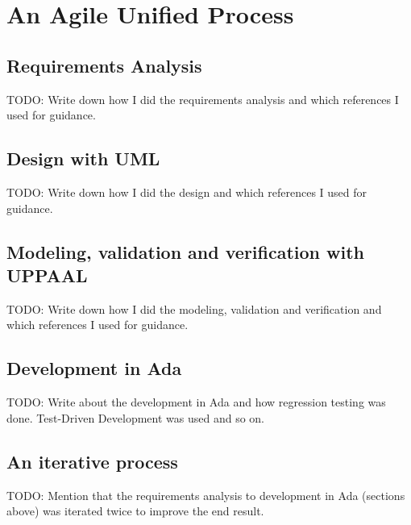 \section{An Agile Unified Process}
\subsection{Requirements Analysis}
TODO: Write down how I did the requirements analysis and which references I
used for guidance.

\subsection{Design with UML}
TODO: Write down how I did the design and which references I used for guidance.

\subsection{Modeling, validation and verification with UPPAAL}
TODO: Write down how I did the modeling, validation and verification and which
references I used for guidance.

\subsection{Development in Ada}
TODO: Write about the development in Ada and how regression testing was done.
Test-Driven Development was used and so on.

\subsection{An iterative process}
TODO: Mention that the requirements analysis to development in Ada (sections
above) was iterated twice to improve the end result.
